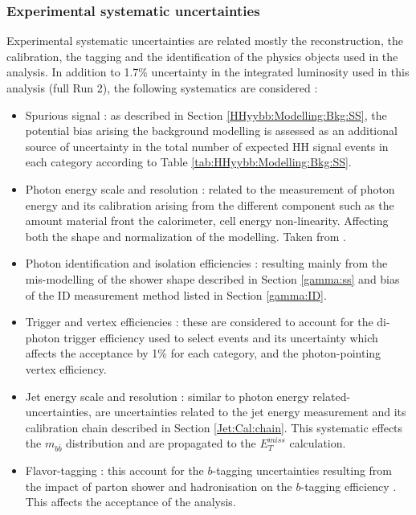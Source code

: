 \subsubsection{Experimental systematic uncertainties}
\label{HHyybb:Syst:Exp}
Experimental systematic uncertainties are related mostly the reconstruction, the calibration, the tagging and the identification of the physics objects used in the analysis. In addition to 1.7\% uncertainty in the integrated luminosity used in this analysis (full Run 2), the following systematics are considered : 
\begin{itemize}
    \item Spurious signal : as described in Section \ref{HHyybb:Modelling:Bkg:SS}, the potential bias arising the background modelling is assessed as an additional source of uncertainty in the total number of expected HH signal events in each category according to Table \ref{tab:HHyybb:Modelling:Bkg:SS}.
    \item Photon energy scale and resolution : related to the measurement of photon energy and its calibration arising from the different component such as the amount material front the calorimeter, cell energy non-linearity. Affecting both the shape and normalization of the modelling. Taken from \cite{PES}.
    \item Photon identification and isolation efficiencies : resulting mainly from the mis-modelling of the shower shape described in Section \ref{gamma:ss} and bias of the ID measurement method listed in Section \ref{gamma:ID}. 
    \item Trigger and vertex efficiencies : these are considered to account for the di-photon trigger efficiency used to select events and its uncertainty which affects the acceptance by 1\% for each category, and the photon-pointing vertex efficiency.
    \item Jet energy scale and resolution : similar to photon energy related-uncertainties, are uncertainties related to the jet energy measurement and its calibration chain described in Section \ref{Jet:Cal:chain}. This systematic effects the $m_{b\bar{b}}$ distribution and are propagated to the $E_{T}^{miss}$ calculation. 
    \item Flavor-tagging : this account for the $b$-tagging uncertainties resulting from the impact of parton shower and hadronisation on the $b$-tagging efficiency \cite{IP2}. This affects the acceptance of the analysis.
\end{itemize}

